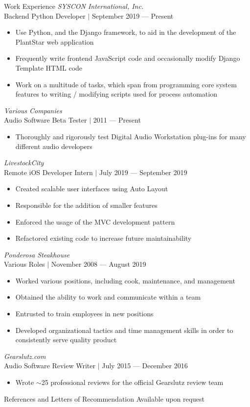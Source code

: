 \documentclass{resume}
\newenvironment{tightlySpacedList}
{ \begin{itemize}
    \setlength{\itemsep}{0pt}
    \setlength{\parskip}{0pt}
    \setlength{\parsep}{0pt}     }
{ \end{itemize}                  }
\begin{document}
\begin{rSection}{Work Experience}
\textit{SYSCON International, Inc.}
\\Backend Python Developer $\mid$ September 2019 --- Present
\begin{tightlySpacedList}
    \item Use Python, and the Django framework, to aid in the development of the
     PlantStar web application
    \item Frequently write frontend JavaScript code and occasionally modify
     Django Template HTML code
    \item Work on a multitude of tasks, which span from programming core system
     features to writing / modifying scripts used for process automation
\end{tightlySpacedList}

\textit{Various Companies}
\\Audio Software Beta Tester $\mid$ 2011 --- Present
\begin{tightlySpacedList}
    \item Thoroughly and rigorously test Digital Audio Workstation plug-ins for
     many different audio developers
\end{tightlySpacedList}

\textit{LivestockCity}
\\Remote iOS Developer Intern $\mid$ July 2019 --- September 2019
\begin{tightlySpacedList}
    \item Created scalable user interfaces using Auto Layout
    \item Responsible for the addition of smaller features
    \item Enforced the usage of the MVC development pattern
    \item Refactored existing code to increase future maintainability
\end{tightlySpacedList}

\textit{Ponderosa Steakhouse}
\\Various Roles $\mid$ November 2008 --- August 2019
\begin{tightlySpacedList}
    \item Worked various positions, including cook, maintenance, and management
    \item Obtained the ability to work and communicate within a team
    \item Entrusted to train employees in new positions
    \item Developed organizational tactics and time management skills in order
     to consistently serve quality product
\end{tightlySpacedList}

\textit{Gearslutz.com}
\\Audio Software Review Writer $\mid$ July 2015 --- December 2016
\begin{tightlySpacedList}
    \item Wrote $\sim$25 professional reviews for the official Gearslutz review
     team
\end{tightlySpacedList}
\end{rSection}

\begin{rSection}{References and Letters of Recommendation}
Available upon request
\end{rSection}
\end{document}
